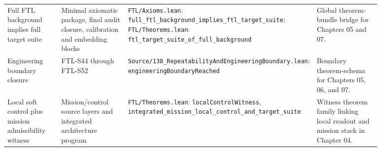 \begin{longtable}{p{0.18\linewidth}p{0.23\linewidth}p{0.19\linewidth}p{0.28\linewidth}}
Full FTL background implies full target suite & Minimal axiomatic package, final audit closure, calibration and embedding blocks & \texttt{FTL/Axioms.lean}: \texttt{full\_ftl\_background\_implies\_ftl\_target\_suite}; \texttt{FTL/Theorems.lean}: \texttt{ftl\_target\_suite\_of\_full\_background} & Global theorem-bundle bridge for Chapters 05 and 07. \\
Engineering boundary closure & FTL-S44 through FTL-S52 & \texttt{Source/138\_RepeatabilityAndEngineeringBoundary.lean}: \texttt{engineeringBoundaryReached} & Boundary theorem-schema for Chapters 05, 06, and 07. \\
Local soft control plus mission admissibility witness & Mission/control source layers and integrated architecture program & \texttt{FTL/Theorems.lean}: \texttt{localControlWitness}, \texttt{integrated\_mission\_local\_control\_and\_target\_suite} & Witness theorem family linking local readout and mission stack in Chapter 04. \\
\bottomrule
\end{longtable}
